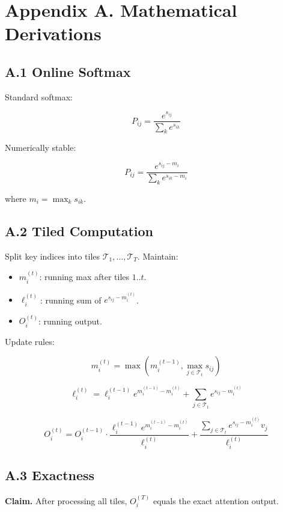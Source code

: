 


\section{Appendix A. Mathematical Derivations}

\subsection{A.1 Online Softmax}

Standard softmax:

\[
P_{ij} = \frac{e^{s_{ij}}}{\sum_k e^{s_{ik}}}
\tag{A.1}
\]

Numerically stable:

\[
P_{ij} = \frac{e^{s_{ij} - m_i}}{\sum_k e^{s_{ik} - m_i}}
\tag{A.2}
\]

where $m_i = \max_k s_{ik}$.

\subsection{A.2 Tiled Computation}

Split key indices into tiles $\mathcal{T}_1, \ldots, \mathcal{T}_T$. Maintain:

\begin{itemize}
\item $m_i^{(t)}$: running max after tiles $1..t$.
\item $\ell_i^{(t)}$: running sum of $e^{s_{ij} - m_i^{(t)}}$.
\item $O_i^{(t)}$: running output.

\end{itemize}
Update rules:

\[
m_i^{(t)} = \max(m_i^{(t-1)}, \max_{j \in \mathcal{T}_t} s_{ij})
\tag{A.3}
\]

\[
\ell_i^{(t)} = \ell_i^{(t-1)} e^{m_i^{(t-1)} - m_i^{(t)}} + \sum_{j \in \mathcal{T}_t} e^{s_{ij} - m_i^{(t)}}
\tag{A.4}
\]

\[
O_i^{(t)} = O_i^{(t-1)} \cdot \frac{\ell_i^{(t-1)} e^{m_i^{(t-1)} - m_i^{(t)}}}{\ell_i^{(t)}} + \frac{\sum_{j \in \mathcal{T}_t} e^{s_{ij} - m_i^{(t)}} v_j}{\ell_i^{(t)}}
\tag{A.5}
\]

\subsection{A.3 Exactness}

\textbf{Claim.} After processing all tiles, $O_i^{(T)}$ equals the exact attention 
output.

